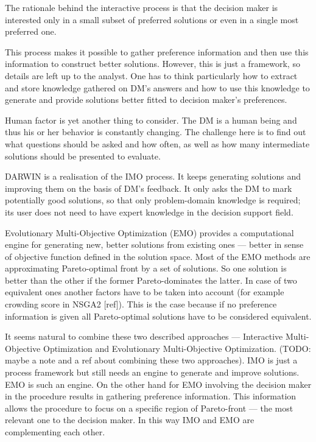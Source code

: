 The rationale behind the interactive process is that the decision maker is
interested only in a small subset of preferred solutions or even in a single
most preferred one.

This process makes it possible to gather preference information and then use
this information to construct better solutions. However, this is just a
framework, so details are left up to the analyst. One has to think
particularly how to extract and store knowledge gathered on DM's answers and
how to use this knowledge to generate and provide solutions better fitted to
decision maker's preferences.

Human factor is yet another thing to consider. The DM is a human being and
thus his or her behavior is constantly changing. The challenge here is to find
out what questions should be asked and how often, as well as how many
intermediate solutions should be presented to evaluate.

DARWIN is a realisation of the IMO process. It keeps generating solutions and
improving them on the basis of DM's feedback. It only asks the DM to mark
potentially good solutions, so that only problem-domain knowledge is required;
its user does not need to have expert knowledge in the decision support field.

Evolutionary Multi-Objective Optimization (EMO) provides a computational
engine for generating new, better solutions from existing ones --- better in
sense of objective function defined in the solution space. Most of the EMO
methods are approximating Pareto-optimal front by a set of solutions. So one
solution is better than the other if the former Pareto-dominates the
latter. In case of two equivalent ones another factors have to be taken into
account (for example crowding score in NSGA2 [ref]). This is the case because
if no preference information is given all Pareto-optimal solutions have to be
considered equivalent.

It seems natural to combine these two described approaches --- Interactive
Multi-Objective Optimization and Evolutionary Multi-Objective
Optimization. (TODO: maybe a note and a ref about combining these two
approaches). IMO is just a process framework but still needs an engine to
generate and improve solutions. EMO is such an engine. On the other hand for
EMO involving the decision maker in the procedure results in gathering
preference information. This information allows the procedure to focus on a
specific region of Pareto-front --- the most relevant one to the decision
maker. In this way IMO and EMO are complementing each other.

